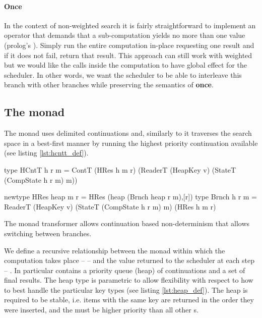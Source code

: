 \paragraph{Once}
In the context of non-weighted search it is fairly
straightforward to implement an operator that demands that a sub-computation yields no more than
one value (prolog's ). Simply run the entire computation
in-place requesting one result and if it does not fail, return that
result. This approach can still work with weighted but we would like
the  calls inside the computation to have global effect for the
scheduler. In other words, we want the scheduler to be able to
interleave this branch with other branches while preserving the
semantics of \textbf{once}.


\subsection{The  monad}
\label{sec:cntt_monad}

The  monad uses delimited continuations and, similarly to
\cite{kidneyAlgebrasWeightedSearch2021} it traverses the search space
in a best-first manner by running the highest priority continuation
available (see listing \ref{lst:hcntt_def}).

\begin{code}
\begin{haskellcode}
type HCntT h r m = ContT (HRes h m r)
  (ReaderT (HeapKey v)
   (StateT (CompState h r m) m))

newtype HRes heap m r = HRes (heap (Brnch heap r m),[r])
type Brnch h r m = ReaderT (HeapKey v)
  (StateT (CompState h r m) m) (HRes h m r)
\end{haskellcode}

  \caption{\label{lst:hcntt_def} The  monad transformer
    allows continuation based non-determinism that allows switching
    between branches.}
\end{code}

We define a recursive relationship between the monad within which the computation
takes place --  -- and the value returned to the scheduler at
each step -- . In particular  contains a priority queue
(heap) of continuations and a set of final results. The heap type is parametric to allow
flexibility with respect to how to best handle the particular key
types (see listing \ref{lst:heap_def}). The heap is required to be stable,
i.e. items with the same key are returned in the order they were
inserted, and the   must be higher priority than all
other s.

